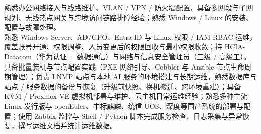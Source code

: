 
\begin{cvparagraph}

熟悉办公网络接入与线路维护、VLAN / VPN / 防火墙配置，具备多网段与子网规划、无线热点网关与跨境访问链路排障经验；熟悉 Windows / Linux 的安装、配置与故障处理。\\
熟悉 Windows Server、AD/GPO、Entra ID 与 Linux 权限 / IAM-RBAC 运维，覆盖账号开通、权限调整、人员变更后的权限回收与最小权限收敛；持 HCIA-Datacom（华为认证 · 数据通信）与网络与信息安全管理员（三级 / 高级工）。\\
具备批量装机与节点配置实践（PXE 网络引导、Cobbler 与 Ansible 节点生命周期管理）；负责 LNMP 站点与本地 AI 服务的环境搭建与长期运维，熟悉数据库与站点 / 服务数据的备份与恢复（升级前快照、换机搬迁、跨环境重建）；具备 KVM / Proxmox VE 虚拟机部署与维护、云主机日常运维经验；熟悉多种主流 Linux 发行版与 openEuler、中标麒麟、统信 UOS、深度等国产系统的部署与配置；使用 Zabbix 监控与 Shell / Python 脚本完成服务检查、日志采集与异常恢复，撰写运维文档并统计运维数据。
\end{cvparagraph}
